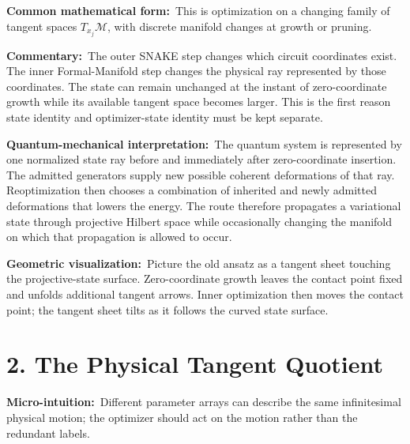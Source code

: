 \documentclass[10pt,twocolumn]{article}
\newcommand{\micro}[1]{\par\noindent\textbf{Micro-intuition:}\ #1\par}
\newcommand{\form}[1]{\par\noindent\textbf{Common mathematical form:}\ #1\par}
\newcommand{\commentary}[1]{\par\noindent\textbf{Commentary:}\ #1\par}
\newcommand{\phys}[1]{\par\noindent\textbf{Quantum-mechanical interpretation:}\ #1\par}
\newcommand{\geom}[1]{\par\noindent\textbf{Geometric visualization:}\ \textcolor{teal!70!black}{#1}\par}
\newcommand{\conceptbreak}{\par\medskip\noindent{\color{black!30}\rule{\columnwidth}{0.35pt}}\par\medskip}
\begin{document}
\form{This is optimization on a changing family of tangent spaces
\(T_{x_j}\mathcal M\), with discrete manifold changes at growth or pruning.}

\commentary{The outer SNAKE step changes which circuit coordinates exist. The
inner Formal-Manifold step changes the physical ray represented by those
coordinates. The state can remain unchanged at the instant of zero-coordinate
growth while its available tangent space becomes larger. This is the first
reason state identity and optimizer-state identity must be kept separate.}

\phys{The quantum system is represented by one normalized state ray before and
immediately after zero-coordinate insertion. The admitted generators supply
new possible coherent deformations of that ray. Reoptimization then chooses a
combination of inherited and newly admitted deformations that lowers the energy.
The route therefore propagates a variational state through projective Hilbert
space while occasionally changing the manifold on which that propagation is
allowed to occur.}

\geom{Picture the old ansatz as a tangent sheet touching the projective-state
surface. Zero-coordinate growth leaves the contact point fixed and unfolds
additional tangent arrows. Inner optimization then moves the contact point;
the tangent sheet tilts as it follows the curved state surface.}

\begin{center}
\end{center}

\conceptbreak

\section*{2. The Physical Tangent Quotient}

\micro{Different parameter arrays can describe the same infinitesimal physical
motion; the optimizer should act on the motion rather than the redundant
labels.}
\end{document}
